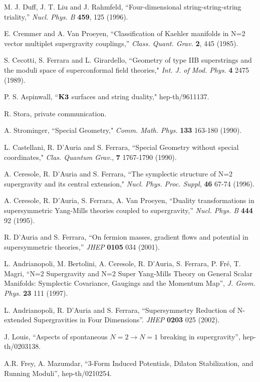 \documentclass[a4paper,12pt]{article}
\begin{document}
\begin{thebibliography}{99}
 M. J. Duff, J. T. Liu and J. Rahmfeld,
``Four-dimensional string-string-string triality,'' {\it Nucl.
Phys. B}  {\bf 459}, 125 (1996).

E. Cremmer and A. Van Proeyen, ``Classification of Kaehler
manifolds in N=2 vector multiplet supergravity couplings,'' {\it
Class. Quant. Grav.}  {\bf 2}, 445 (1985).



 S. Cecotti, S. Ferrara and L. Girardello, ``Geometry
of type IIB superstrings and the moduli space of superconformal
field theories," {\it Int. J. of Mod. Phys.} {\bf 4} 2475 (1989).

 P. S. Aspinwall, ``$\mathbf{K3}$ surfaces and string duality,"
hep-th/9611137.

 R. Stora, private communication.

 A. Strominger, ``Special Geometry," {\it Comm. Math.
Phys.} {\bf 133} 163-180 (1990).

 L. Castellani, R. D'Auria and S. Ferrara, ``Special
Geometry without special coordinates," {\it Clas. Quantum Grav.},
{\bf 7} 1767-1790 (1990).

 A. Ceresole, R. D'Auria and S. Ferrara,
``The symplectic structure of N=2 supergravity and its central
extension," {\it Nucl. Phys. Proc. Suppl}, {\bf 46} 67-74 (1996).

A. Ceresole, R. D'Auria, S. Ferrara, A. Van Proeyen, ``Duality
transformations in supersymmetric Yang-Mills theories coupled to
supergravity,'' {\it Nucl. Phys.  B} {\bf 444} 92 (1995).


 R. D'Auria and S. Ferrara, ``On fermion masses,
gradient flows and potential in supersymmetric  theories,''
{\it JHEP} {\bf 0105} 034 (2001).

L. Andrianopoli, M. Bertolini, A. Ceresole, R. D'Auria, S.
Ferrara, P. Fr\'e, T. Magri, ``N=2 Supergravity and N=2 Super
Yang-Mills Theory on General Scalar Manifolds: Symplectic
Covariance, Gaugings and the Momentum Map'', {\it  J. Geom. Phys.}
{\bf 23} 111 (1997).

L. Andrianopoli, R. D'Auria and S. Ferrara, ``Supersymmetry
Reduction of N-extended Supergravities in Four  Dimensions''. {\it
JHEP} {\bf 0203} 025 (2002).

 J. Louis,
``Aspects of spontaneous $N = 2 \to  N = 1$ breaking in
supergravity'', hep-th/0203138.

A.R. Frey, A. Mazumdar, ``3-Form Induced Potentials, Dilaton
Stabilization, and Running Moduli'', hep-th/0210254.


\end{thebibliography}
\end{document}

